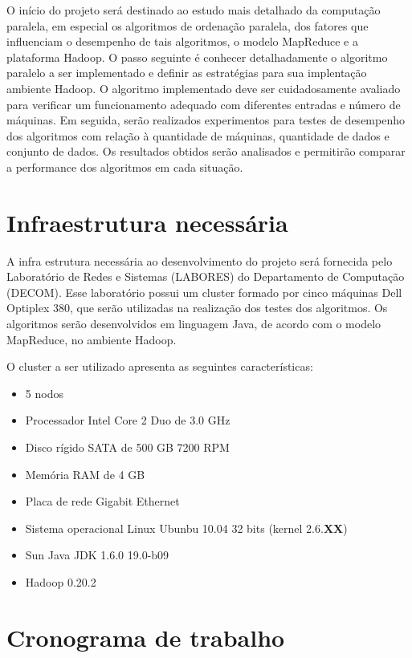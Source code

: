 O início do projeto será destinado ao estudo mais detalhado da computação paralela, em especial os algoritmos de ordenação paralela, dos fatores que influenciam o desempenho de tais algoritmos, o modelo MapReduce e a plataforma Hadoop. O passo seguinte é conhecer detalhadamente o algoritmo paralelo a ser implementado e definir as estratégias para sua implentação ambiente Hadoop. 
O algoritmo implementado deve ser cuidadosamente avaliado para verificar um funcionamento adequado com diferentes entradas e número de máquinas. 
Em seguida, serão realizados experimentos para testes de desempenho dos algoritmos com relação à quantidade de máquinas, quantidade de dados e conjunto de dados.  Os resultados obtidos serão analisados e permitirão comparar a performance dos algoritmos em cada situação. 


\section{Infraestrutura necessária}

A infra estrutura necessária ao desenvolvimento do projeto será fornecida pelo Laboratório de Redes e Sistemas (LABORES) do Departamento de Computação (DECOM). Esse laboratório possui um cluster formado por cinco máquinas Dell Optiplex 380, que serão utilizadas na realização dos testes dos algoritmos. Os algoritmos serão desenvolvidos em linguagem Java, de acordo com o modelo MapReduce, no ambiente Hadoop. 

O cluster a ser utilizado apresenta as seguintes características:
\begin{itemize}
\item 5 nodos
\item Processador Intel Core 2 Duo de 3.0 GHz
\item Disco rígido SATA de 500 GB 7200 RPM
\item Memória RAM de 4 GB
\item Placa de rede Gigabit Ethernet
\item Sistema operacional Linux Ubunbu 10.04 32 bits (kernel 2.6.\textbf{XX})
\item Sun Java JDK 1.6.0 19.0-b09 
\item Hadoop 0.20.2
\end{itemize}

\section{Cronograma de trabalho}

